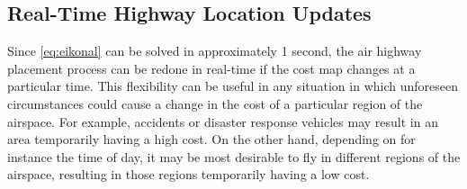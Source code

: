 \subsection{Real-Time Highway Location Updates}
Since \eqref{eq:eikonal} can be solved in approximately 1 second, the air highway placement process can be redone in real-time if the cost map changes at a particular time. This flexibility can be useful in any situation in which unforeseen circumstances could cause a change in the cost of a particular region of the airspace. For example, accidents or disaster response vehicles may result in an area temporarily having a high cost. On the other hand, depending on for instance the time of day, it may be most desirable to fly in different regions of the airspace, resulting in those regions temporarily having a low cost.